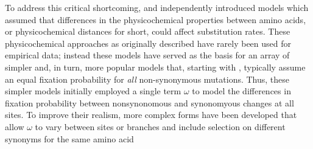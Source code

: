\documentclass[12pt,letterpaper,fleqn]{article}
\newcommand{\PC}{physicochemical\xspace}
\begin{document}
To address this critical shortcoming, \citet{GoldmanAndYang1994} and \citet{MuseAndGaut1994} independently introduced models which assumed that differences in the \PC properties between amino acids, or \PC distances for short, could affect substitution rates.
These \PC approaches as originally described have rarely been used for empirical data; instead these models have served as the basis for an array of simpler and, in turn, more popular models that, starting with \citet{YangAndNielsen1998,NielsenAndYang1998}, typically assume an equal fixation probability for \emph{all} non-synonymous mutations.
Thus, these simpler models initially employed a single term $\omega$ to model the differences in fixation probability between nonsynonomous and synonomyous changes at all sites.
To improve their realism, more complex forms have been developed that allow $\omega$ to vary between sites or branches \citep[as cited in ][]{Anisimova2012} and include selection on different synonyms for the same amino acid \cite[e.g.][]{YangAndNielsen2008} %
\end{document}
